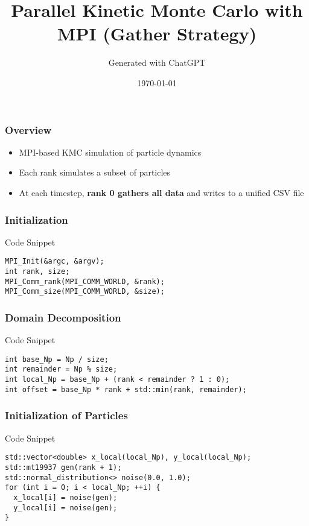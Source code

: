 \documentclass[10pt]{beamer}
\title{Parallel Kinetic Monte Carlo with MPI (Gather Strategy)}
\author{Generated with ChatGPT}
\date{\today}
\begin{document}
\begin{frame}[fragile]
  \titlepage
\end{frame}

\begin{frame}[fragile]
\frametitle{Overview}
\begin{itemize}
  \item MPI-based KMC simulation of particle dynamics
  \item Each rank simulates a subset of particles
  \item At each timestep, \textbf{rank 0 gathers all data} and writes to a unified CSV file
\end{itemize}
\end{frame}

\begin{frame}[fragile]
\frametitle{Initialization}
\begin{block}{Code Snippet}
\begin{minipage}{\linewidth}
\begin{verbatim}
MPI_Init(&argc, &argv);
int rank, size;
MPI_Comm_rank(MPI_COMM_WORLD, &rank);
MPI_Comm_size(MPI_COMM_WORLD, &size);
\end{verbatim}
\end{minipage}
\end{block}
\end{frame}

\begin{frame}[fragile]
\frametitle{Domain Decomposition}
\begin{block}{Code Snippet}
\begin{minipage}{\linewidth}
\begin{verbatim}
int base_Np = Np / size;
int remainder = Np % size;
int local_Np = base_Np + (rank < remainder ? 1 : 0);
int offset = base_Np * rank + std::min(rank, remainder);
\end{verbatim}
\end{minipage}
\end{block}
\end{frame}

\begin{frame}[fragile]
\frametitle{Initialization of Particles}
\begin{block}{Code Snippet}
\begin{minipage}{\linewidth}
\begin{verbatim}
std::vector<double> x_local(local_Np), y_local(local_Np);
std::mt19937 gen(rank + 1);
std::normal_distribution<> noise(0.0, 1.0);
for (int i = 0; i < local_Np; ++i) {
  x_local[i] = noise(gen);
  y_local[i] = noise(gen);
}
\end{verbatim}
\end{minipage}
\end{block}
\end{frame}
\end{document}
